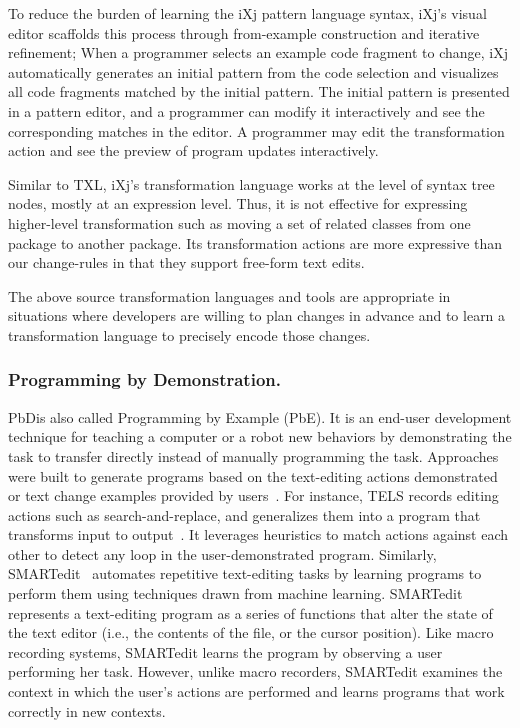\documentclass[runningheads,a4paper]{llncs}
\begin{document}
To reduce the burden of learning the iXj pattern language syntax, iXj's visual editor scaffolds this process through from-example construction and iterative refinement; When a programmer selects an example code fragment to change, iXj automatically generates an initial pattern from the code selection and visualizes all code fragments matched by the initial pattern. The initial pattern is presented in a pattern editor, and a programmer can modify it interactively and see the corresponding matches in the editor. A programmer may edit the transformation action and see the preview of program updates interactively. 

Similar to TXL, iXj's transformation language works at the level of syntax tree nodes, mostly at an expression level. Thus, it is not effective for expressing higher-level transformation such as moving a set of related classes from one package to another package. Its transformation actions are more expressive than our change-rules in that they support free-form text edits.

The above source transformation languages and tools are appropriate in situations where developers are willing to plan changes in advance and to learn a transformation language to precisely encode those changes.

\subsubsection{Programming by Demonstration.} 
PbDis also called Programming by Example (PbE). It is an end-user development technique for teaching a computer or a robot new behaviors by demonstrating the task to transfer directly instead of manually programming the task.
Approaches were built to generate programs based on the text-editing actions demonstrated or text change examples provided by users~\cite{Nix1984,wiki:bsd-comparison,LaH1995,LWD2001}. For instance, 
TELS records editing actions such as search-and-replace, and generalizes them into a program that transforms input to output~\cite{wiki:bsd-comparison}. It leverages heuristics to match actions against each other to detect any loop in the user-demonstrated program. 
Similarly, SMARTedit~\cite{LWD2001} automates repetitive text-editing tasks by learning programs to perform them using techniques drawn from machine learning. SMARTedit represents a text-editing program as a series of functions that alter the state of the text editor (i.e., the contents of the file, or the cursor position). Like macro recording systems, SMARTedit learns the program by observing a user performing her task. However, unlike macro recorders, SMARTedit examines the context in which the user's actions are performed and learns programs that work correctly in new contexts. 
\end{document}
